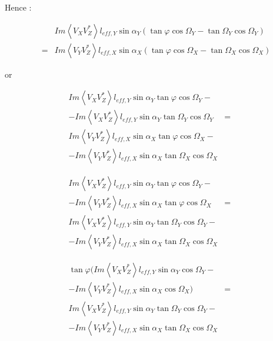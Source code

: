 \documentclass[a4paper,11pt]{report}
\begin{document}
Hence :

\begin{eqnarray}
& & Im \left\langle V_X V_Z^{*}\right\rangle l_{eff,Y} \sin \alpha_Y ( \tan \varphi \cos \Omega_Y-\tan \Omega_Y \cos \Omega_Y) \\
&=& Im \left\langle V_Y V_Z^{*}\right\rangle l_{eff,X} \sin \alpha_X (\tan \varphi \cos \Omega_X-\tan \Omega_X \cos \Omega_X) \nonumber
\end{eqnarray}

or

\begin{eqnarray}
 Im \left\langle V_X V_Z^{*}\right\rangle l_{eff,Y} \sin \alpha_Y \tan \varphi \cos \Omega_Y - & &\\
 -Im \left\langle V_X V_Z^{*}\right\rangle l_{eff,Y} \sin \alpha_Y \tan \Omega_Y \cos \Omega_Y &=&\nonumber\\
 Im \left\langle V_Y V_Z^{*}\right\rangle l_{eff,X} \sin \alpha_X \tan \varphi \cos \Omega_X - & &\nonumber \\
 -Im \left\langle V_Y V_Z^{*}\right\rangle l_{eff,X} \sin \alpha_X \tan \Omega_X \cos \Omega_X & &\nonumber
\end{eqnarray}

\begin{eqnarray}
 Im \left\langle V_X V_Z^{*}\right\rangle l_{eff,Y} \sin \alpha_Y \tan \varphi \cos \Omega_Y-& &\\
 -Im \left\langle V_Y V_Z^{*}\right\rangle l_{eff,X} \sin \alpha_X \tan \varphi \cos \Omega_X &=&\nonumber \\
 Im \left\langle V_X V_Z^{*}\right\rangle l_{eff,Y} \sin \alpha_Y \tan \Omega_Y \cos \Omega_Y - & &\nonumber\\
 -Im \left\langle V_Y V_Z^{*}\right\rangle l_{eff,X} \sin \alpha_X \tan \Omega_X \cos \Omega_X & &\nonumber
\end{eqnarray}

\begin{eqnarray}
\tan \varphi  (Im \left\langle V_X V_Z^{*}\right\rangle l_{eff,Y} \sin \alpha_Y \cos \Omega_Y-& &\\
 -Im \left\langle V_Y V_Z^{*}\right\rangle l_{eff,X} \sin \alpha_X  \cos \Omega_X) &=&\nonumber \\
 Im \left\langle V_X V_Z^{*}\right\rangle l_{eff,Y} \sin \alpha_Y \tan \Omega_Y \cos \Omega_Y -& &\nonumber\\
 -Im \left\langle V_Y V_Z^{*}\right\rangle l_{eff,X} \sin \alpha_X \tan \Omega_X \cos \Omega_X & &\nonumber
\end{eqnarray}
\end{document}
